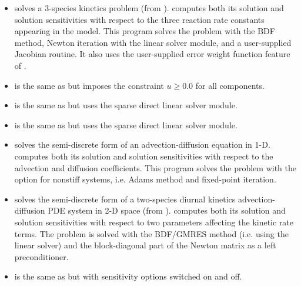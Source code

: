 \begin{itemize}
\item {}
  solves a 3-species kinetics problem (from ).
  \newline
  {\cvodes} computes both its solution and solution sensitivities with respect
  to the three reaction rate constants appearing in the model. 
  This program solves the problem with the BDF method, Newton          
  iteration with the {\sunlinsoldense} linear solver module, and a user-supplied    
  Jacobian routine. It also uses the user-supplied error
  weight function feature of {\cvodes}.
\item {}
  is the same as  but imposes the constraint
  $u \geq 0.0$ for all components.
\item {}
  is the same as  but uses the
  {\sunlinsolklu} sparse direct linear solver module.
\item {}
  is the same as  but uses the
  {\sunlinsolslumt} sparse direct linear solver module.
\item {}
  solves the semi-discrete form of an advection-diffusion equation in 1-D.
  \newline
  {\cvodes} computes both its solution and solution sensitivities with respect
  to the advection and diffusion coefficients.
  This program solves the problem with the option for nonstiff systems,
  i.e. Adams method and fixed-point iteration.
\item {}
  solves the semi-discrete form of a two-species diurnal kinetics
  advection-diffusion PDE system in 2-D space (from ).
  \newline
  {\cvodes} computes both its solution and solution sensitivities with respect
  to two parameters affecting the kinetic rate terms.
  The problem is solved with the BDF/GMRES method (i.e. using the {\sunlinsolspgmr}
  linear solver) and the block-diagonal part of the  
  Newton matrix as a left preconditioner.
\item {} is the same as 
  but with sensitivity options switched on and off.



\end{itemize}
